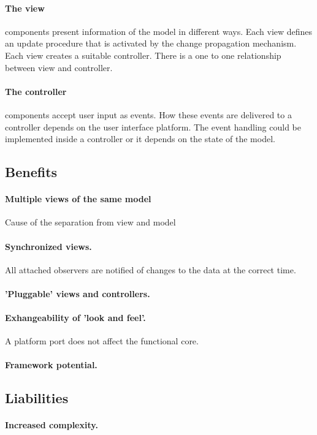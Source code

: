 \documentclass[a4paper,11pt,twocolumn]{report}
\begin{document}
    \paragraph{The view} components present information of the model in
    different ways. Each view defines an update procedure that is activated by
    the change propagation mechanism. Each view creates a suitable controller.
    There is a one to one relationship between view and controller.
    \paragraph{The controller} components accept user input as events. How
    these events are delivered to a controller depends on the user interface
    platform. The event handling could be implemented inside a controller or it
    depends on the state of the model.
    \subsection{Benefits}
    \paragraph{Multiple views of the same model} Cause of the separation from
    view and model
    \paragraph{Synchronized views.} All attached observers are notified of
    changes to the data at the correct time.
    \paragraph{'Pluggable' views and controllers.} 
    \paragraph{Exhangeability of 'look and feel'.} A platform port does not
    affect the functional core.
    \paragraph{Framework potential.}
    \subsection{Liabilities}
    \paragraph{Increased complexity.}
\end{document}
